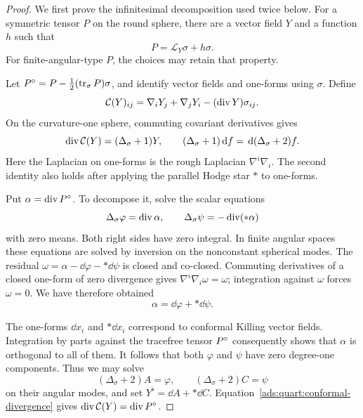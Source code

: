 \begin{proof}
We first prove the infinitesimal decomposition used twice below.  For
a symmetric tensor \(P\) on the round sphere, there are a vector
field \(Y\) and a function \(h\) such that
\begin{equation}
 P=\mathcal L_Y\sigma+h\sigma.
 \label{ads:quart:sphere-splitting}
\end{equation}
For finite-angular-type \(P\), the choices may retain that property.

Let \(P^{\circ}=P-\frac12(\operatorname{tr}_\sigma P)\sigma\), and identify vector
fields and one-forms using \(\sigma\).  Define
\[
 \mathcal C(Y)_{ij}
   =\nabla_iY_j+\nabla_jY_i-(\operatorname{div} Y)\sigma_{ij}.
\]
On the curvature-one sphere, commuting covariant derivatives gives
\begin{equation}
 \operatorname{div}\mathcal C(Y)=(\Delta_\sigma+1)Y,
 \qquad
 (\Delta_\sigma+1)\,\mathrm d f=\,\mathrm d(\Delta_\sigma+2)f.
 \label{ads:quart:conformal-divergence}
\end{equation}
Here the Laplacian on one-forms is the rough Laplacian
\(\nabla^i\nabla_i\).
The second identity also holds after applying the parallel Hodge star
\(*\) to one-forms.

Put \(\alpha=\operatorname{div} P^{\circ}\).  To decompose it, solve the scalar
equations
\[
 \Delta_\sigma\varphi=\operatorname{div}\alpha,\qquad
 \Delta_\sigma\psi=-\operatorname{div}(*\alpha)
\]
with zero means.  Both right sides have zero integral.  In finite
angular spaces these equations are solved by inversion on the
nonconstant spherical modes.  The residual
\(\omega=\alpha-\dd\varphi-*\dd\psi\) is closed and co-closed.
Commuting derivatives of a closed one-form of zero divergence gives
\(\nabla^i\nabla_i\omega=\omega\); integration against \(\omega\)
forces \(\omega=0\).  We have therefore obtained
\[
 \alpha=\dd\varphi+*\dd\psi.
\]

The one-forms \(\dd x_i\) and \(*\dd x_i\) correspond to conformal
Killing vector fields.  Integration by parts against the tracefree
tensor \(P^{\circ}\) consequently shows that \(\alpha\) is
orthogonal to all of them.  It follows that both \(\varphi\) and
\(\psi\) have zero degree-one components.  Thus we may solve
\[
 (\Delta_\sigma+2)A=\varphi,\qquad
 (\Delta_\sigma+2)C=\psi
\]
on their angular modes, and set \(Y^\flat=\dd A+*\dd C\).
Equation~\eqref{ads:quart:conformal-divergence} gives
\(\operatorname{div}\mathcal C(Y)=\operatorname{div} P^{\circ}\).


\end{proof}
